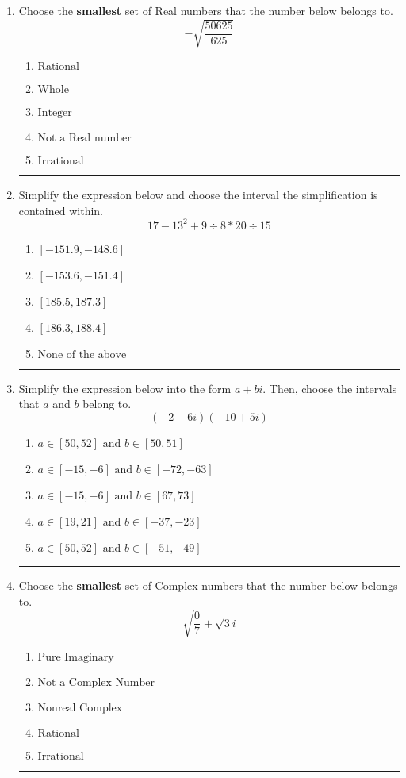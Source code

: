 \documentclass[14pt]{extbook}
\newcommand{\litem}[1]{\item#1\hspace*{-1cm}\rule{\textwidth}{0.4pt}}
\begin{document}
\begin{enumerate}
{\begin{enumerate}[label=\Alph*.]
\end{enumerate} }
\litem{
Choose the \textbf{smallest} set of Real numbers that the number below belongs to.\[ -\sqrt{\frac{50625}{625}} \]\begin{enumerate}[label=\Alph*.]
\item \( \text{Rational} \)
\item \( \text{Whole} \)
\item \( \text{Integer} \)
\item \( \text{Not a Real number} \)
\item \( \text{Irrational} \)

\end{enumerate} }
\litem{
Simplify the expression below and choose the interval the simplification is contained within.\[ 17 - 13^2 + 9 \div 8 * 20 \div 15 \]\begin{enumerate}[label=\Alph*.]
\item \( [-151.9, -148.6] \)
\item \( [-153.6, -151.4] \)
\item \( [185.5, 187.3] \)
\item \( [186.3, 188.4] \)
\item \( \text{None of the above} \)

\end{enumerate} }
\litem{
Simplify the expression below into the form $a+bi$. Then, choose the intervals that $a$ and $b$ belong to.\[ (-2 - 6 i)(-10 + 5 i) \]\begin{enumerate}[label=\Alph*.]
\item \( a \in [50, 52] \text{ and } b \in [50, 51] \)
\item \( a \in [-15, -6] \text{ and } b \in [-72, -63] \)
\item \( a \in [-15, -6] \text{ and } b \in [67, 73] \)
\item \( a \in [19, 21] \text{ and } b \in [-37, -23] \)
\item \( a \in [50, 52] \text{ and } b \in [-51, -49] \)

\end{enumerate} }
\litem{
Choose the \textbf{smallest} set of Complex numbers that the number below belongs to.\[ \sqrt{\frac{0}{7}}+\sqrt{3}i \]\begin{enumerate}[label=\Alph*.]
\item \( \text{Pure Imaginary} \)
\item \( \text{Not a Complex Number} \)
\item \( \text{Nonreal Complex} \)
\item \( \text{Rational} \)
\item \( \text{Irrational} \)


\end{enumerate}}
\end{enumerate}
\end{document}
